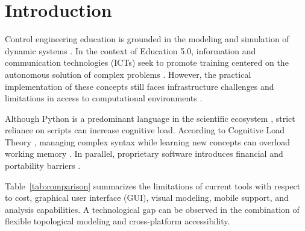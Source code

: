 \documentclass[conference]{IEEEtran}
\begin{document}
\section{Introduction}

Control engineering education is grounded in the modeling and simulation of dynamic systems \cite{dorf2017}. In the context of Education 5.0, information and communication technologies (ICTs) seek to promote training centered on the autonomous solution of complex problems \cite{cordeiro2024}. However, the practical implementation of these concepts still faces infrastructure challenges and limitations in access to computational environments \cite{fujiwara1992}.

Although Python is a predominant language in the scientific ecosystem \cite{reznichenko2025}, strict reliance on scripts can increase cognitive load. According to Cognitive Load Theory \cite{SWELLER2024102423}, managing complex syntax while learning new concepts can overload working memory \cite{santos2024,oliveira2025}. In parallel, proprietary software introduces financial and portability barriers \cite{manathunga2025}.

Table~\ref{tab:comparison} summarizes the limitations of current tools with respect to cost, graphical user interface (GUI), visual modeling, mobile support, and analysis capabilities. A technological gap can be observed in the combination of flexible topological modeling and cross-platform accessibility.
\end{document}
